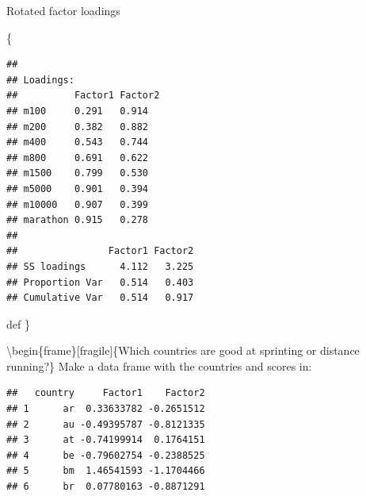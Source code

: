 \documentclass[ignorenonframetext,]{beamer}
\newenvironment{Shaded}{\begin{snugshade}}{\end{snugshade}}
\newcommand{\DataTypeTok}[1]{\textcolor[rgb]{0.13,0.29,0.53}{#1}}
\newcommand{\DecValTok}[1]{\textcolor[rgb]{0.00,0.00,0.81}{#1}}
\newcommand{\KeywordTok}[1]{\textcolor[rgb]{0.13,0.29,0.53}{\textbf{#1}}}
\newcommand{\NormalTok}[1]{#1}
\newcommand{\OperatorTok}[1]{\textcolor[rgb]{0.81,0.36,0.00}{\textbf{#1}}}
\newcommand{\StringTok}[1]{\textcolor[rgb]{0.31,0.60,0.02}{#1}}
\begin{document}
\begin{frame}[fragile]{Rotated factor loadings}
\protect\hypertarget{rotated-factor-loadings}{}

\{\small

\begin{Shaded}
\end{Shaded}

\begin{verbatim}
## 
## Loadings:
##          Factor1 Factor2
## m100     0.291   0.914  
## m200     0.382   0.882  
## m400     0.543   0.744  
## m800     0.691   0.622  
## m1500    0.799   0.530  
## m5000    0.901   0.394  
## m10000   0.907   0.399  
## marathon 0.915   0.278  
## 
##                Factor1 Factor2
## SS loadings      4.112   3.225
## Proportion Var   0.514   0.403
## Cumulative Var   0.514   0.917
\end{verbatim}

def \}

\textbackslash{}begin\{frame\}{[}fragile{]}\{Which countries are good at
sprinting or distance running?\} Make a data frame with the countries
and scores in:

\begin{Shaded}
\end{Shaded}

\begin{verbatim}
##   country     Factor1    Factor2
## 1      ar  0.33633782 -0.2651512
## 2      au -0.49395787 -0.8121335
## 3      at -0.74199914  0.1764151
## 4      be -0.79602754 -0.2388525
## 5      bm  1.46541593 -1.1704466
## 6      br  0.07780163 -0.8871291
\end{verbatim}

\end{frame}
\end{document}
